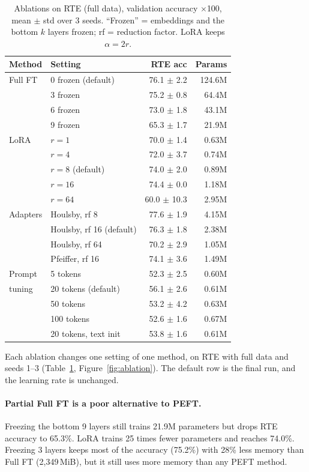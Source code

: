 \documentclass[11pt]{article}
\begin{document}
\begin{table}[t]
\centering
\small
\begin{tabular}{@{}llrr@{}}
\toprule
Method & Setting & RTE acc & Params \\
\midrule
Full FT & 0 frozen (default) & 76.1 $\pm$ 2.2 & 124.6M \\
 & 3 frozen & 75.2 $\pm$ 0.8 & 64.4M \\
 & 6 frozen & 73.0 $\pm$ 1.8 & 43.1M \\
 & 9 frozen & 65.3 $\pm$ 1.7 & 21.9M \\
\midrule
LoRA & $r{=}1$ & 70.0 $\pm$ 1.4 & 0.63M \\
 & $r{=}4$ & 72.0 $\pm$ 3.7 & 0.74M \\
 & $r{=}8$ (default) & 74.0 $\pm$ 2.0 & 0.89M \\
 & $r{=}16$ & 74.4 $\pm$ 0.0 & 1.18M \\
 & $r{=}64$ & 60.0 $\pm$ 10.3 & 2.95M \\
\midrule
Adapters & Houlsby, rf 8 & 77.6 $\pm$ 1.9 & 4.15M \\
 & Houlsby, rf 16 (default) & 76.3 $\pm$ 1.8 & 2.38M \\
 & Houlsby, rf 64 & 70.2 $\pm$ 2.9 & 1.05M \\
 & Pfeiffer, rf 16 & 74.1 $\pm$ 3.6 & 1.49M \\
\midrule
Prompt & 5 tokens & 52.3 $\pm$ 2.5 & 0.60M \\
tuning & 20 tokens (default) & 56.1 $\pm$ 2.6 & 0.61M \\
 & 50 tokens & 53.2 $\pm$ 4.2 & 0.63M \\
 & 100 tokens & 52.6 $\pm$ 1.6 & 0.67M \\
 & 20 tokens, text init & 53.8 $\pm$ 1.6 & 0.61M \\
\bottomrule
\end{tabular}
\caption{Ablations on RTE (full data), validation accuracy $\times$100, mean $\pm$ std over 3 seeds. ``Frozen'' = embeddings and the bottom $k$ layers frozen; rf = reduction factor. LoRA keeps $\alpha{=}2r$.}
\label{tab:ablation}
\end{table}

Each ablation changes one setting of one method, on RTE with full data and seeds 1--3 (Table~\ref{tab:ablation}, Figure~\ref{fig:ablation}). The default row is the final run, and the learning rate is unchanged.

\paragraph{Partial Full FT is a poor alternative to PEFT.} Freezing the bottom 9 layers still trains 21.9M parameters but drops RTE accuracy to 65.3\%. LoRA trains 25 times fewer parameters and reaches 74.0\%. Freezing 3 layers keeps most of the accuracy (75.2\%) with 28\% less memory than Full FT (2,349\,MiB), but it still uses more memory than any PEFT method.
\end{document}
